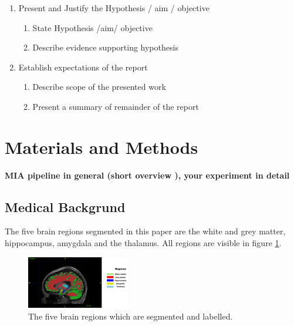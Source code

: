 \documentclass[journal]{IEEEtran}
\begin{document}
{\begin{enumerate}
		\begin{enumerate}
		\item Explain what is the state of the art / current practice
		\item Explain what preliminary / related work has been done towards solving the problem by you and others
		\item Explain what deficiencies / problems still exist (specifically the one that you will try to address)
		\end{enumerate}
	\item Present and Justify the Hypothesis / aim / objective
		\begin{enumerate}
		\item State Hypothesis /aim/ objective
		\item Describe evidence supporting hypothesis
		\end{enumerate}
	\item Establish expectations of the report
		\begin{enumerate}
		\item Describe scope of the presented work
		\item Present a summary of remainder of the report\\
		\end{enumerate}
	\end{enumerate} 
}



\section{Materials and Methods}
\textbf{MIA pipeline in general (short overview ), your experiment in detail}
\subsection{Medical Backgrund}
	The five brain regions segmented in this paper are the white and grey matter, hippocampus, amygdala and the thalamus. All regions are visible in figure \ref{fig:e1}.

	\begin{figure}[h]
		\centering
		\includegraphics[width=0.4\textwidth]{T1native_all_regions_labelled}
		\caption{The five brain regions which are segmented and labelled.}
		\label{fig:e1}
	\end{figure}
\end{document}
